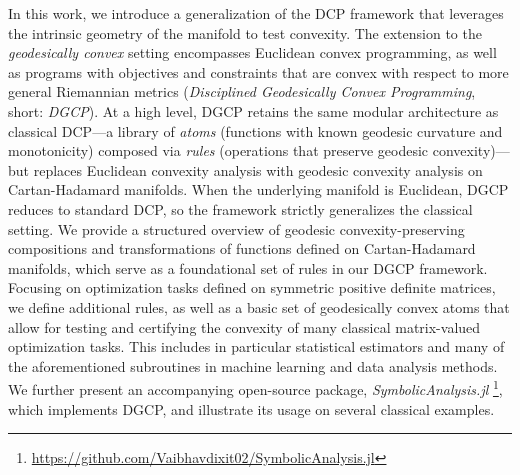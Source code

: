 \documentclass[twoside,11pt]{article}
\begin{document}
In this work, we introduce a generalization of the DCP framework that leverages the intrinsic geometry of the manifold to test convexity. The extension to the \emph{geodesically convex} setting encompasses Euclidean convex programming, as well as programs with objectives and constraints that are convex with respect to more general Riemannian metrics (\emph{Disciplined Geodesically Convex Programming}, short: \emph{DGCP}). At a high level, DGCP retains the same modular architecture as classical DCP---a library of \emph{atoms} (functions with known geodesic curvature and monotonicity) composed via \emph{rules} (operations that preserve geodesic convexity)---but replaces Euclidean convexity analysis with geodesic convexity analysis on Cartan-Hadamard manifolds. When the underlying manifold is Euclidean, DGCP reduces to standard DCP, so the framework strictly generalizes the classical setting.
We provide a structured overview of geodesic convexity-preserving compositions and transformations of functions defined on Cartan-Hadamard manifolds, which serve as a foundational set of rules in our DGCP framework.
Focusing on optimization tasks defined on symmetric positive definite matrices, we define additional rules, as well as a basic set of geodesically convex atoms that allow for testing and certifying the convexity of many classical matrix-valued optimization tasks. This includes in particular statistical estimators and many of the aforementioned subroutines in machine learning and data analysis methods. We further present an accompanying open-source package, \textsl{SymbolicAnalysis.jl} \footnote{\url{https://github.com/Vaibhavdixit02/SymbolicAnalysis.jl}}, which implements DGCP, and illustrate its usage on several classical examples.
\end{document}
